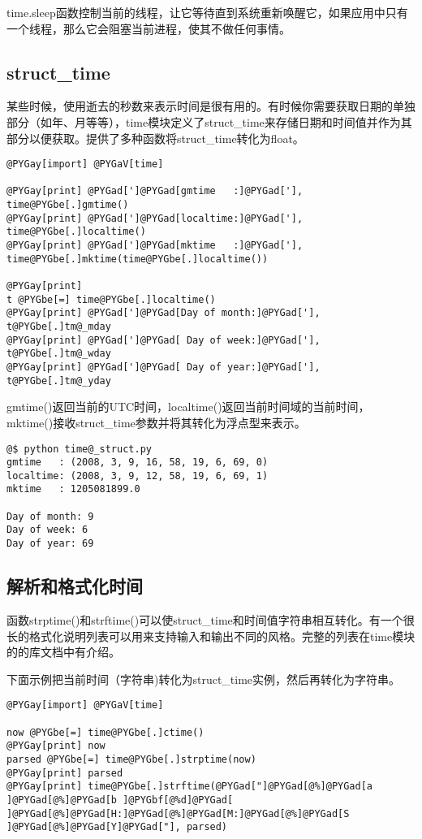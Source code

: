 \documentclass[a4paper,10pt,english]{manual}
\begin{document}
time.sleep函数控制当前的线程，让它等待直到系统重新唤醒它，如果应用中只有一个线程，那么它会阻塞当前进程，使其不做任何事情。


\subsection{struct\_time}

某些时候，使用逝去的秒数来表示时间是很有用的。有时候你需要获取日期的单独部分（如年、月等等），time模块定义了struct\_time来存储日期和时间值并作为其部分以便获取。提供了多种函数将struct\_time转化为float。

\begin{Verbatim}[commandchars=@\[\]]
@PYGay[import] @PYGaV[time]

@PYGay[print] @PYGad[']@PYGad[gmtime   :]@PYGad['], time@PYGbe[.]gmtime()
@PYGay[print] @PYGad[']@PYGad[localtime:]@PYGad['], time@PYGbe[.]localtime()
@PYGay[print] @PYGad[']@PYGad[mktime   :]@PYGad['], time@PYGbe[.]mktime(time@PYGbe[.]localtime())

@PYGay[print]
t @PYGbe[=] time@PYGbe[.]localtime()
@PYGay[print] @PYGad[']@PYGad[Day of month:]@PYGad['], t@PYGbe[.]tm@_mday
@PYGay[print] @PYGad[']@PYGad[ Day of week:]@PYGad['], t@PYGbe[.]tm@_wday
@PYGay[print] @PYGad[']@PYGad[ Day of year:]@PYGad['], t@PYGbe[.]tm@_yday
\end{Verbatim}

gmtime()返回当前的UTC时间，localtime()返回当前时间域的当前时间，mktime()接收struct\_time参数并将其转化为浮点型来表示。

\begin{Verbatim}[commandchars=@\[\]]
@$ python time@_struct.py
gmtime   : (2008, 3, 9, 16, 58, 19, 6, 69, 0)
localtime: (2008, 3, 9, 12, 58, 19, 6, 69, 1)
mktime   : 1205081899.0

Day of month: 9
Day of week: 6
Day of year: 69
\end{Verbatim}


\subsection{解析和格式化时间}

函数strptime()和strftime()可以使struct\_time和时间值字符串相互转化。有一个很长的格式化说明列表可以用来支持输入和输出不同的风格。完整的列表在time模块的的库文档中有介绍。

下面示例把当前时间（字符串)转化为struct\_time实例，然后再转化为字符串。

\begin{Verbatim}[commandchars=@\[\]]
@PYGay[import] @PYGaV[time]

now @PYGbe[=] time@PYGbe[.]ctime()
@PYGay[print] now
parsed @PYGbe[=] time@PYGbe[.]strptime(now)
@PYGay[print] parsed
@PYGay[print] time@PYGbe[.]strftime(@PYGad["]@PYGad[@%]@PYGad[a ]@PYGad[@%]@PYGad[b ]@PYGbf[@%d]@PYGad[ ]@PYGad[@%]@PYGad[H:]@PYGad[@%]@PYGad[M:]@PYGad[@%]@PYGad[S ]@PYGad[@%]@PYGad[Y]@PYGad["], parsed)
\end{Verbatim}
\end{document}
